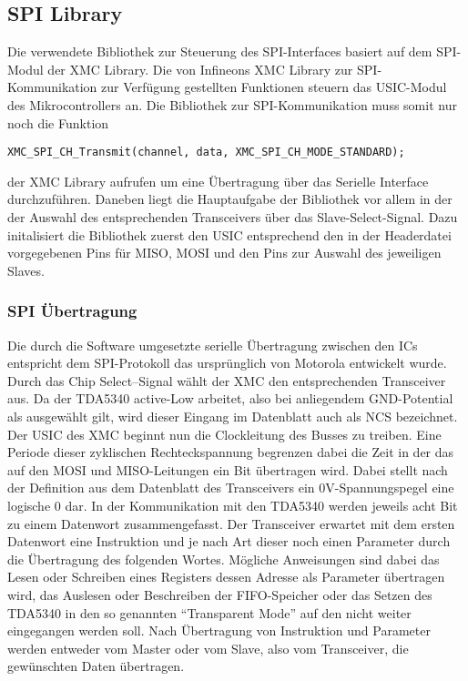 \subsection{SPI Library}
Die verwendete Bibliothek zur Steuerung des \ac{SPI}-Interfaces basiert auf dem \ac{SPI}-Modul der XMC Library. Die von Infineons XMC Library zur \ac{SPI}-Kommunikation zur Verfügung gestellten Funktionen steuern das \ac{USIC}-Modul des Mikrocontrollers an. Die Bibliothek zur \ac{SPI}-Kommunikation muss somit nur noch die Funktion
\begin{lstlisting}
XMC_SPI_CH_Transmit(channel, data, XMC_SPI_CH_MODE_STANDARD);
\end{lstlisting} der XMC Library aufrufen um eine Übertragung über das Serielle Interface durchzuführen. Daneben liegt die Hauptaufgabe der Bibliothek vor allem in der der Auswahl des entsprechenden Transceivers über das Slave-Select-Signal. Dazu initalisiert die Bibliothek zuerst den \ac{USIC} entsprechend den in der Headerdatei vorgegebenen Pins für MISO, MOSI und den Pins zur Auswahl des jeweiligen Slaves.

\subsubsection*{SPI Übertragung}
Die durch die Software umgesetzte serielle Übertragung zwischen den \acp{IC} entspricht dem \ac{SPI}-Protokoll das ursprünglich von Motorola entwickelt wurde\cite{BuchSPI}. Durch das Chip Select–Signal wählt der XMC den entsprechenden Transceiver aus. Da der TDA5340 active-Low arbeitet, also bei anliegendem \ac{GND}-Potential als ausgewählt gilt, wird dieser Eingang im Datenblatt auch als \acf{NCS} bezeichnet. 
Der \ac{USIC} des XMC beginnt nun die Clockleitung des Busses zu treiben. Eine Periode dieser zyklischen Rechteckspannung begrenzen dabei die Zeit in der das auf den \ac{MOSI} und \ac{MISO}-Leitungen ein Bit übertragen wird. Dabei stellt nach der Definition aus dem Datenblatt des Transceivers ein $0$V-Spannungspegel eine logische $0$ dar. In der Kommunikation mit den TDA5340 werden jeweils acht Bit zu einem Datenwort zusammengefasst. Der Transceiver erwartet mit dem ersten Datenwort eine Instruktion und je nach Art dieser noch einen Parameter durch die Übertragung des folgenden Wortes. Mögliche Anweisungen sind dabei das Lesen oder Schreiben eines Registers dessen Adresse als Parameter übertragen wird, das Auslesen oder Beschreiben der \ac{FIFO}-Speicher oder das Setzen des TDA5340 in den so genannten \enquote{Transparent Mode} auf den nicht weiter eingegangen werden soll. Nach Übertragung von Instruktion und Parameter werden entweder vom Master oder vom Slave, also vom Transceiver, die gewünschten Daten übertragen.

